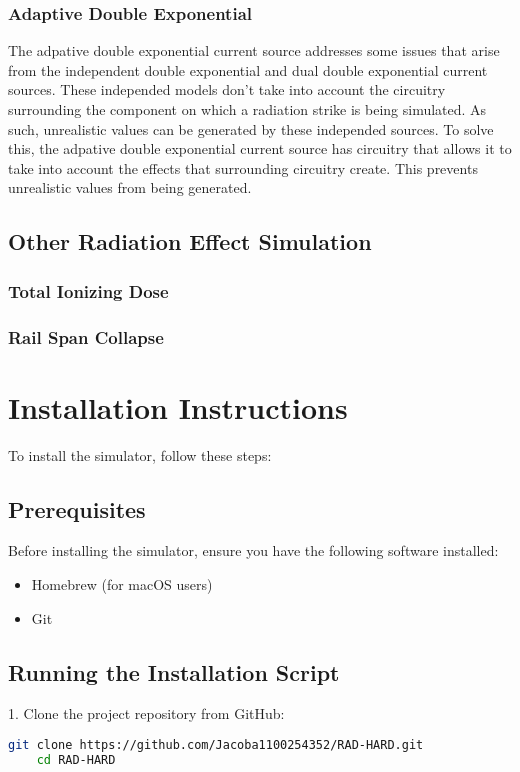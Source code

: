 \documentclass[12pt]{article}
\begin{document}
\subsubsection{Adaptive Double Exponential}
The adpative double exponential current source addresses some issues that arise from the independent double exponential and dual double exponential current sources. These independed models don't take into account the circuitry surrounding the component on which a radiation strike is being simulated. As such, unrealistic values can be generated by these independed sources. To solve this, the adpative double exponential current source has circuitry that allows it to take into account the effects that surrounding circuitry create. This prevents unrealistic values from being generated. 
\subsection{Other Radiation Effect Simulation}
\subsubsection{Total Ionizing Dose}
\subsubsection{Rail Span Collapse}


\section{Installation Instructions}
To install the simulator, follow these steps:

\subsection{Prerequisites}
Before installing the simulator, ensure you have the following software installed:
\begin{itemize}
    \item Homebrew (for macOS users)
    \item Git
\end{itemize}

\subsection{Running the Installation Script}
1. Clone the project repository from GitHub:
    \begin{lstlisting}[language=bash, breaklines=true]
    git clone https://github.com/Jacoba1100254352/RAD-HARD.git
    cd RAD-HARD
    \end{lstlisting}
\end{document}
